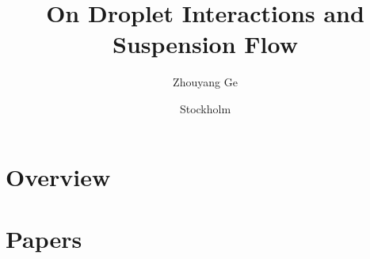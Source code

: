 \documentclass{MechThesis}
\title[On droplet interactions and suspension flow]%
{%
	On Droplet Interactions and Suspension Flow
}%
\author{Zhouyang Ge}%
\affiliation
{%
        Linn\'e FLOW Centre and
        Swedish e-Science Research Centre (SeRC)\\
        Department of Engineering Mechanics,
        KTH Royal Institute of Technology\\
	SE--100 44 Stockholm, Sweden%
}%
\date{Stockholm}{March}{2020}%
\begin{document}
\iffalse

\frontmatter


\fi


\mainmatter

\part{Overview}






\tocpagebreak

\iffalse
%
\part{Papers}

%
\makepapersummary
\cleardoublepage

%


%


%


%


%

\end{document}
